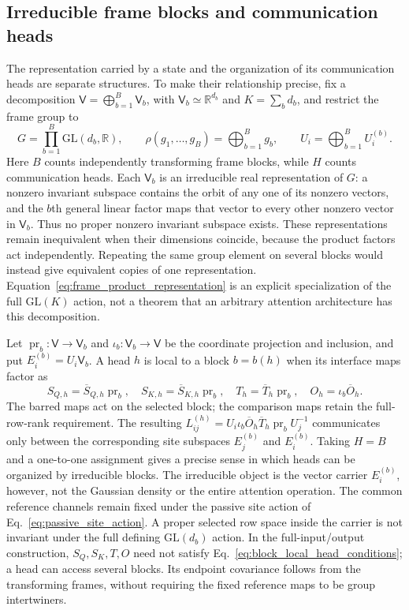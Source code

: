 \documentclass[twoside,11pt]{article}
\begin{document}
\subsection{Irreducible frame blocks and communication heads}
\label{sec:heads_irreps}

The representation carried by a state and the organization of its communication heads are separate structures. To make their relationship precise, fix a decomposition $\mathsf V=\bigoplus_{b=1}^{B}\mathsf V_b$, with $\mathsf V_b\simeq\mathbb R^{d_b}$ and $K=\sum_bd_b$, and restrict the frame group to
\begin{equation}
G=\prod_{b=1}^{B}\mathrm{GL}(d_b,\mathbb R),\qquad
\rho(g_1,\ldots,g_B)=\bigoplus_{b=1}^{B}g_b,\qquad
U_i=\bigoplus_{b=1}^{B}U_i^{(b)}.
\label{eq:frame_product_representation}
\end{equation}
Here $B$ counts independently transforming frame blocks, while $H$ counts communication heads. Each $\mathsf V_b$ is an irreducible real representation of $G$: a nonzero invariant subspace contains the orbit of any one of its nonzero vectors, and the $b$th general linear factor maps that vector to every other nonzero vector in $\mathsf V_b$. Thus no proper nonzero invariant subspace exists. These representations remain inequivalent when their dimensions coincide, because the product factors act independently. Repeating the same group element on several blocks would instead give equivalent copies of one representation. Equation~\eqref{eq:frame_product_representation} is an explicit specialization of the full $\mathrm{GL}(K)$ action, not a theorem that an arbitrary attention architecture has this decomposition.

Let $\operatorname{pr}_b:\mathsf V\to\mathsf V_b$ and $\iota_b:\mathsf V_b\to\mathsf V$ be the coordinate projection and inclusion, and put $E_i^{(b)}=U_i\mathsf V_b$. A head $h$ is local to a block $b=b(h)$ when its interface maps factor as
\begin{equation}
S_{Q,h}=\overline S_{Q,h}\operatorname{pr}_b,\quad
S_{K,h}=\overline S_{K,h}\operatorname{pr}_b,\quad
T_h=\overline T_h\operatorname{pr}_b,\quad
O_h=\iota_b\overline O_h.
\label{eq:block_local_head_conditions}
\end{equation}
The barred maps act on the selected block; the comparison maps retain the full-row-rank requirement. The resulting $L_{ij}^{(h)}=U_i\iota_b\overline O_h\overline T_h\operatorname{pr}_bU_j^{-1}$ communicates only between the corresponding site subspaces $E_j^{(b)}$ and $E_i^{(b)}$. Taking $H=B$ and a one-to-one assignment gives a precise sense in which heads can be organized by irreducible blocks. The irreducible object is the vector carrier $E_i^{(b)}$, however, not the Gaussian density or the entire attention operation. The common reference channels remain fixed under the passive site action of Eq.~\eqref{eq:passive_site_action}. A proper selected row space inside the carrier is not invariant under the full defining $\mathrm{GL}(d_b)$ action. In the full-input/output construction, $S_Q,S_K,T,O$ need not satisfy Eq.~\eqref{eq:block_local_head_conditions}; a head can access several blocks. Its endpoint covariance follows from the transforming frames, without requiring the fixed reference maps to be group intertwiners.
\end{document}
